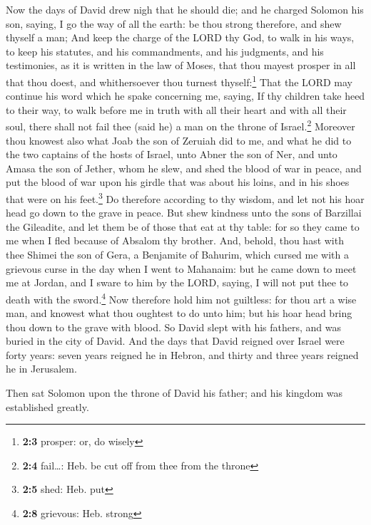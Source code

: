  Now the days of David drew nigh that he should die; and
he charged Solomon his son, saying,  I go the way of all
the earth: be thou strong therefore, and shew thyself a man;
 And keep the charge of the LORD thy God, to walk in his
ways, to keep his statutes, and his commandments, and his judgments, and
his testimonies, as it is written in the law of Moses, that thou mayest
prosper in all that thou doest, and whithersoever thou turnest
thyself:\footnote{\textbf{2:3} prosper: or, do wisely} 
That the LORD may continue his word which he spake concerning me,
saying, If thy children take heed to their way, to walk before me in
truth with all their heart and with all their soul, there shall not fail
thee (said he) a man on the throne of Israel.\footnote{\textbf{2:4}
  fail\ldots: Heb. be cut off from thee from the throne} 
Moreover thou knowest also what Joab the son of Zeruiah did to me, and
what he did to the two captains of the hosts of Israel, unto Abner the
son of Ner, and unto Amasa the son of Jether, whom he slew, and shed the
blood of war in peace, and put the blood of war upon his girdle that was
about his loins, and in his shoes that were on his feet.\footnote{\textbf{2:5}
  shed: Heb. put}  Do therefore according to thy wisdom,
and let not his hoar head go down to the grave in peace. 
But shew kindness unto the sons of Barzillai the Gileadite, and let them
be of those that eat at thy table: for so they came to me when I fled
because of Absalom thy brother.  And, behold, thou hast
with thee Shimei the son of Gera, a Benjamite of Bahurim, which cursed
me with a grievous curse in the day when I went to Mahanaim: but he came
down to meet me at Jordan, and I sware to him by the LORD, saying, I
will not put thee to death with the sword.\footnote{\textbf{2:8}
  grievous: Heb. strong}  Now therefore hold him not
guiltless: for thou art a wise man, and knowest what thou oughtest to do
unto him; but his hoar head bring thou down to the grave with blood.
 So David slept with his fathers, and was buried in the
city of David.  And the days that David reigned over
Israel were forty years: seven years reigned he in Hebron, and thirty
and three years reigned he in Jerusalem.

 Then sat Solomon upon the throne of David his father;
and his kingdom was established greatly.

